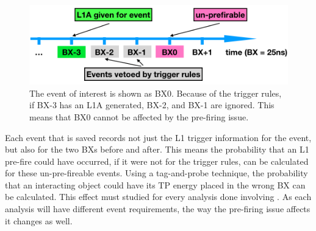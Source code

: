 \begin{figure}[!tp]
  \centering
  \includegraphics[width=\textwidth]{figures/unprefirable.png}
  \caption{The event of interest is shown as BX0.  Because of the trigger rules, if BX-3 has an L1A generated, BX-2, and BX-1 are ignored.  This means that BX0 cannot be affected by the pre-firing issue.}
 
  \label{fig:L1unprefireable}
\end{figure}

Each event that is saved records not just the L1 trigger information for the event, but also for the two BXs before and after. This means the probability that an L1 pre-fire could have occurred, if it were not for the trigger rules, can be calculated for these un-pre-fireable events. Using a tag-and-probe technique, the probability that an \ECAL interacting object could have its TP energy placed in the wrong BX can be calculated.  This effect must studied for every analysis done involving \ECAL. As each analysis will have different event requirements, the way the pre-firing issue affects it changes as well.

